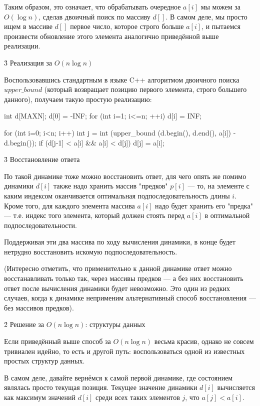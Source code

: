 Таким образом, это означает, что обрабатывать очередное $a[i]$ мы можем за $O (\log n)$, сделав двоичный поиск по массиву $d[]$. В самом деле, мы просто ищем в массиве $d[]$ первое число, которое строго больше $a[i]$, и пытаемся произвести обновление этого элемента аналогично приведённой выше реализации.


\h3{ Реализация за $O (n \log n)$ }

Воспользовавшись стандартным в языке C++ алгоритмом двоичного поиска $upper\_bound$ (который возвращает позицию первого элемента, строго большего данного), получаем такую простую реализацию:

\code
int d[MAXN];
d[0] = -INF;
for (int i=1; i<=n; ++i)
	d[i] = INF;

for (int i=0; i<n; i++) {
	int j = int (upper_bound (d.begin(), d.end(), a[i]) - d.begin());
	if (d[j-1] < a[i] && a[i] < d[j])
		d[j] = a[i];
}
\endcode


\h3{ Восстановление ответа }

По такой динамике тоже можно восстановить ответ, для чего опять же помимо динамики $d[i]$ также надо хранить массив "предков" $p[i]$ --- то, на элементе с каким индексом оканчивается оптимальная подпоследовательность длины $i$. Кроме того, для каждого элемента массива $a[i]$ надо будет хранить его "предка" --- т.е. индекс того элемента, который должен стоять перед $a[i]$ в оптимальной подпоследовательности.

Поддерживая эти два массива по ходу вычисления динамики, в конце будет нетрудно восстановить искомую подпоследовательность.

(Интересно отметить, что применительно к данной динамике ответ можно восстанавливать только так, через массивы предков --- а без них восстановить ответ после вычисления динамики будет невозможно. Это один из редких случаев, когда к динамике неприменим альтернативный способ восстановления --- без массивов предков).



\h2{ Решение за $O (n \log n)$: структуры данных }

Если приведённый выше способ за $O (n \log n)$ весьма красив, однако не совсем тривиален идейно, то есть и другой путь: воспользоваться одной из известных простых структур данных.

В самом деле, давайте вернёмся к самой первой динамике, где состоянием являлась просто текущая позиция. Текущее значение динамики $d[i]$ вычисляется как максимум значений $d[i]$ среди всех таких элементов $j$, что $a[j] < a[i]$.


